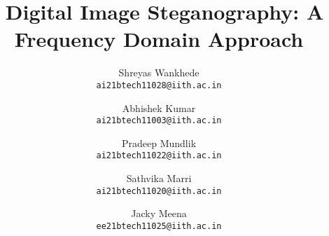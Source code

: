 \documentclass[10pt,twocolumn,letterpaper]{article}
\title{\ Digital Image Steganography: A Frequency Domain Approach}
\author{Shreyas Wankhede\\
{\tt\small ai21btech11028@iith.ac.in}
\and
Abhishek Kumar\\
{\tt\small ai21btech11003@iith.ac.in}
\and
Pradeep Mundlik\\
{\tt\small ai21btech11022@iith.ac.in}
\and
Sathvika Marri\\
{\tt\small ai21btech11020@iith.ac.in}
\and
Jacky Meena\\
{\tt\small ee21btech11025@iith.ac.in}
}
\begin{document}
\maketitle
    



{
    \small
    \nocite{*}
    
    
    
}

% 
\end{document}
